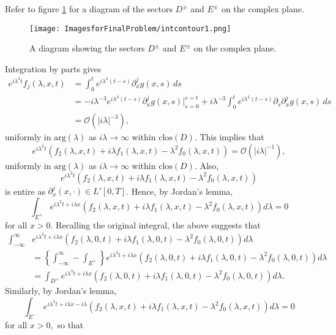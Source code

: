 Refer to figure \ref{fig:intcontour} for a diagram of the sectors $D^{\pm}$ and $E^{\pm}$ on the complex plane.
\begin{figure}
\texttt{[image: ImagesforFinalProblem/intcontour1.png]}
\caption{A diagram showing the sectors $D^{\pm}$ and $E^{\pm}$ on the complex plane.}
\centering\label{fig:intcontour}
\end{figure}
Integration by parts gives
\begin{align*}
    e^{i\lambda^3t}f_j(\lambda,x,t) &= \int_0^t e^{i\lambda^3(t-s)}\partial_x^jg(x,s)\,ds\\
    &= -i\lambda^{-3}e^{i\lambda^3(t-s)}\partial_x^jg(x,s)\bigg|_{s=0}^{s=t} + i\lambda^{-3} \int_0^t e^{i\lambda^3(t-s)}\partial_s\partial_x^jg(x,s)\,ds\\
    &= \mathcal{O}(|i\lambda|^{-3}),
\end{align*}
uniformly in $\mathrm{arg}(\lambda)$ as $i\lambda \to \infty$ within $\mathrm{clos}(D)$. This implies that \[e^{i \lambda^3 t}\left(f_2(\lambda, x, t) + i \lambda f_1(\lambda, x, t) - \lambda^2 f_0(\lambda, x, t)\right) = \mathcal{O}(|i\lambda|^{-1}),\]
uniformly in $\mathrm{arg}(\lambda)$ as $i\lambda \to \infty$ within $\mathrm{clos}(D)$. Also, \[e^{i \lambda^3 t}\left(f_2(\lambda, x, t) + i \lambda f_1(\lambda, x, t) - \lambda^2 f_0(\lambda, x, t)\right)\]
is entire as $\partial_x^j(x,\cdot) \in L'[0,T]$. Hence, by Jordan's lemma,
\[\int_{E^+} e^{i \lambda^3 t+i\lambda x}\left(f_2(\lambda, x, t) + i \lambda f_1(\lambda, x, t) - \lambda^2 f_0(\lambda, x, t)\right)d\lambda = 0\]
for all $x > 0$.
Recalling the original integral, the above suggests that 
\begin{align*}
    \int_{-\infty}^{\infty} &e^{i \lambda^3 t+i\lambda x}\left(f_2(\lambda, 0, t) + i \lambda f_1(\lambda, 0, t) - \lambda^2 f_0(\lambda, 0, t)\right)d\lambda \\
    &= \left\{ \int_{-\infty}^{\infty} - \int_{E^+} \right\} e^{i \lambda^3 t+i\lambda x}\left(f_2(\lambda, 0, t) + i \lambda f_1(\lambda, 0, t) - \lambda^2 f_0(\lambda, 0, t)\right)d\lambda \\
    &= \int_{D^+} e^{i \lambda^3 t+i\lambda x}\left(f_2(\lambda, 0, t) + i \lambda f_1(\lambda, 0, t) - \lambda^2 f_0(\lambda, 0, t)\right)d\lambda.
\end{align*}
Similarly, by Jordan's lemma, 
\[\int_{E^-} e^{i \lambda^3 t+i\lambda x - i \lambda}\left(f_2(\lambda, x, t) + i \lambda f_1(\lambda, x, t) - \lambda^2 f_0(\lambda, x, t)\right)d\lambda = 0\]
for all $x > 0,$ so that 
